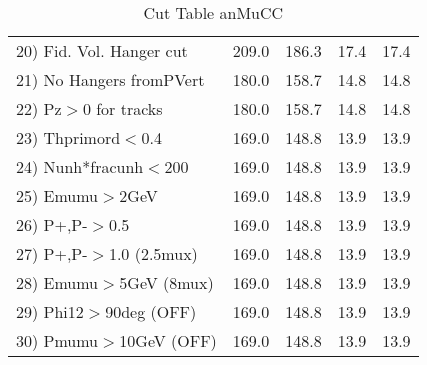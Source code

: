 \begin{table}[h!]
\begin{tabular}{||l||r|r|r|r||}
 20) Fid. Vol. Hanger cut &       209.0 &       186.3 &        17.4 &        17.4 \\
 21) No Hangers fromPVert &       180.0 &       158.7 &        14.8 &        14.8 \\
 22) Pz$>$0 for tracks    &       180.0 &       158.7 &        14.8 &        14.8 \\
 23) Thprimord$<$0.4      &       169.0 &       148.8 &        13.9 &        13.9 \\
 24) Nunh*fracunh$<$200   &       169.0 &       148.8 &        13.9 &        13.9 \\
 25) Emumu$>$2GeV         &       169.0 &       148.8 &        13.9 &        13.9 \\
 26) P+,P-$>$0.5          &       169.0 &       148.8 &        13.9 &        13.9 \\
 27) P+,P-$>$1.0 (2.5mux) &       169.0 &       148.8 &        13.9 &        13.9 \\
 28) Emumu$>$5GeV  (8mux) &       169.0 &       148.8 &        13.9 &        13.9 \\
 29) Phi12$>$90deg  (OFF) &       169.0 &       148.8 &        13.9 &        13.9 \\
 30) Pmumu$>$10GeV  (OFF) &       169.0 &       148.8 &        13.9 &        13.9 \\
 \hline
 \hline
 \end{tabular}
 \caption{Cut Table  anMuCC }
 \label{tab-cut_anmcc}
 \end{table}
